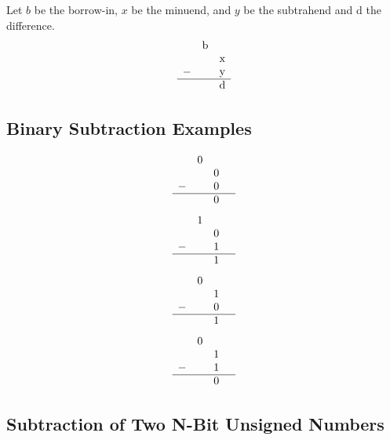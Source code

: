 \documentclass[12pt,openany, tikz,border=10pt]{book}
\begin{document}
Let $b$ be the borrow-in, $x$ be the minuend, and $y$ be the subtrahend and d the difference. 
\[
    \begin{array}{cccccc}
        &$b$ \\
        & &$x$\\
        - & &$y$ \\
        \hline
         & &$d$ \\
    \end{array}
    \]

\subsection{Binary Subtraction Examples}



    \[
        \begin{array}{cccc}
        &0 & \\
          & &0 & \\
         - & &0 & \\
        \hline
         & &0 & \\
        \end{array}
        \]
        \[
        \begin{array}{cccc}
          &1 & \\
          & &0 & \\
         - & &1 & \\
        \hline
        & &1 & \\
        \end{array}
        \]
        \[
        \begin{array}{cccc}
         & 0 & \\
         & &1 & \\
         - & &0 & \\
        \hline
         & &1 & \\
        \end{array}
        \]
        \[
        \begin{array}{cccc}
            & 0 & \\
         & &1 & \\
         - & &1 & \\
        \hline
         & &0 & \\
        \end{array}
        \]

\subsection{Subtraction of Two N-Bit Unsigned Numbers}
\end{document}
